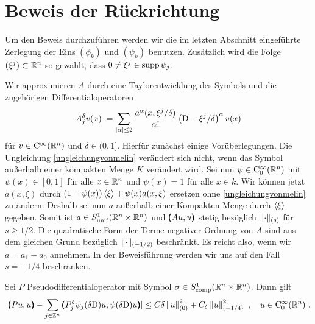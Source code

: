 \section{Beweis der Rückrichtung}

Um den Beweis durchzuführen werden wir die im letzten Abschnitt eingeführte Zerlegung der Eins $(\phi_k)$ und $(\psi_k)$ benutzen. Zusätzlich wird die Folge $(\xi^j)\subset \mathbb R^n$ so gewählt, dass $0\neq \xi^j\in\operatorname{supp} \psi_j$.

Wir approximieren $A$ durch eine Taylorentwicklung des Symbols und die zugehörigen Differentialoperatoren
\begin{align}
 A_j^\delta v (x):=\sum_{\lvert\alpha\rvert \le 2} \frac{a^\alpha(x,\xi^j/\delta)}{\alpha!}\left( \mathrm D - \xi^j/\delta\right)^\alpha v(x)
\end{align}
für $v\in\mathrm {C}^\infty(\mathbb R^n)$ und $\delta\in(0,1]$. Hierfür zunächst einige Vorüberlegungen. Die Ungleichung \eqref{ungleichungvonmelin} verändert sich nicht, wenn das Symbol außerhalb einer kompakten Menge $K$ verändert wird. Sei nun $\psi\in\mathrm{C}^\infty_0(\mathbb R^n)$ mit $\psi(x)\in[0,1]$ für alle $x\in\mathbb R^n$ und $\psi(x)=1$ für alle $x\in k$. Wir können jetzt $a(x,\xi)$ durch $(1-\psi(x))\braket{\xi} + \psi(x)a(x,\xi)$ ersetzen ohne \eqref{ungleichungvonmelin} zu ändern. Deshalb sei nun $a$ außerhalb einer Kompakten Menge durch $\braket{\xi}$ gegeben. Somit ist $a\in S_\mathrm{unif}^1(\mathbb R^n\times\mathbb R^n)$ und $\pmb(Au,u\pmb)$ stetig bezüglich $\lVert\cdot\rVert _{(s)}$ für $s\ge 1/2$. Die quadratische Form der Terme negativer Ordnung von $A$ sind aus dem gleichen Grund bezüglich $\lVert\cdot\rVert _{(-1/2)}$ beschränkt. Es reicht also, wenn wir $a=a_1+a_0$ annehmen. In der Beweisführung werden wir uns auf den Fall $s=-1/4$ beschränken.

\begin{lem}
Sei $P$ Pseudodifferentialoperator mit Symbol $\sigma\in S^1_{\rm comp}(\mathbb R^n\times\mathbb R^n)$. Dann gilt
\begin{align}\label{hilfsungl1}
\lvert
\pmb(P u,u\pmb) - \sum_{j\in\mathbb Z^n}\pmb( P_j^\delta\psi_j(\delta\mathrm D )u, \psi(\delta\mathrm D )u \pmb)
\rvert
\le C\delta \left\lVert u\right\rVert ^2_{(0)} + C_\delta \left\lVert u\right\rVert ^2_{(-1/4)}\ ,\quad u\in\mathrm {C}^\infty_0(\mathbb R^n)\ .
\end{align}
\end{lem}

